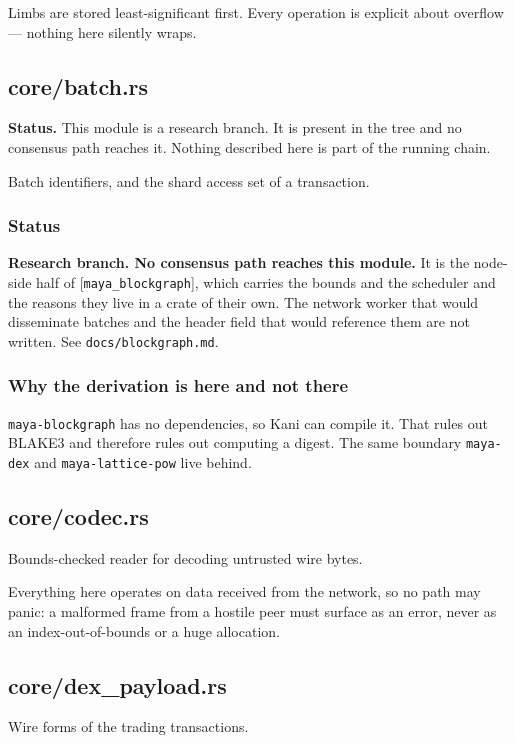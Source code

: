 \documentclass[11pt,a4paper]{article}
\begin{document}
Limbs are stored least-significant first. Every operation is explicit about
overflow — nothing here silently wraps.

\subsection{core/batch.rs}
\begin{framed}\noindent\textbf{Status.} This module is a research branch. It is present in the tree and no consensus path reaches it. Nothing described here is part of the running chain.\end{framed}

Batch identifiers, and the shard access set of a transaction.

\subsubsection{Status}

\textbf{Research branch. No consensus path reaches this module.} It is the
node-side half of [\texttt{maya\_blockgraph}], which carries the bounds and the
scheduler and the reasons they live in a crate of their own. The network
worker that would disseminate batches and the header field that would
reference them are not written. See \texttt{docs/blockgraph.md}.

\subsubsection{Why the derivation is here and not there}

\texttt{maya-blockgraph} has no dependencies, so Kani can compile it. That rules
out BLAKE3 and therefore rules out computing a digest. The same boundary
\texttt{maya-dex} and \texttt{maya-lattice-pow} live behind.

\subsection{core/codec.rs}
Bounds-checked reader for decoding untrusted wire bytes.

Everything here operates on data received from the network, so no path may
panic: a malformed frame from a hostile peer must surface as an error, never
as an index-out-of-bounds or a huge allocation.

\subsection{core/dex\_payload.rs}
Wire forms of the trading transactions.
\end{document}
